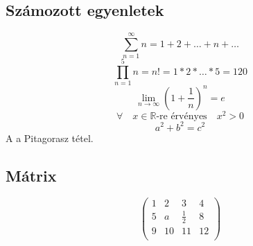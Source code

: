 \documentclass[12pt]{article}
\begin{document}
\subsection{Számozott egyenletek}
\begin{equation}
\sum_{n=1}^{\infty}n=1+2+\ldots+n+\ldots
\end{equation} \label{eg1}
\begin{equation}
\prod^{5}_{n=1}n=n! = 1 \ast 2 \ast \ldots \ast 5 = 120
\end{equation}\label{eg2}
\begin{equation}
\lim_{n\longrightarrow \infty} \left(1+ \dfrac{1}{n}\right)^n = e
\end{equation}\label{eg3}
\begin{equation}
\forall \quad x \in \mathbb{R} \textrm{-re érvényes} \quad x^{2}>0
\end{equation}\label{eg4}
\begin{equation}
a^{2}+b^{2}=c^{2}
\end{equation}
A  a Pitagorasz tétel.

\subsection{Mátrix}
$$
\left(
\begin{array}{cccc}
1 & 2 & 3 & 4\\
5 & a & \frac{1}{2} & 8\\
9 & 10 & 11 & 12 \\

\end{array}\right)
$$
\end{document}
